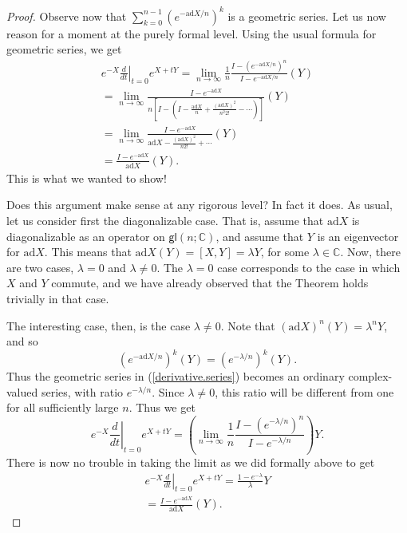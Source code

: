 \documentclass{amsbook}
\theoremstyle{plain}
\numberwithin{equation}{chapter}
\numberwithin{theorem}{chapter}
\begin{document}
\begin{proof}
Observe now that $\sum_{k=0}^{n-1}\left(  e^{-\mathrm{ad}X/n}\right)  ^{k}$ is
a geometric series. Let us now reason for a moment at the purely formal level.
Using the usual formula for geometric series, we get
\begin{align*}
e^{-X}\left.  \frac{d}{dt}\right|  _{t=0}e^{X+tY}=\lim_{n\rightarrow\infty
}\frac{1}{n}\frac{I-\left(  e^{-\mathrm{ad}X/n}\right)  ^{n}}%
{I-e^{-\mathrm{ad}X/n}}(Y)\\
=\lim_{n\rightarrow\infty}\frac{I-e^{-\mathrm{ad}X}}{n\left[  I-\left(
I-\frac{\mathrm{ad}X}{n}+\frac{(\mathrm{ad}X)^{2}}{n^{2}2!}-\cdots\right)
\right]  }(Y)\\
=\lim_{n\rightarrow\infty}\frac{I-e^{-\mathrm{ad}X}}{\mathrm{ad}%
X-\frac{(\mathrm{ad}X)^{2}}{n2!}+\cdots}(Y)\\
=\frac{I-e^{-\mathrm{ad}X}}{\mathrm{ad}X}(Y)\text{.}%
\end{align*}
This is what we wanted to show!

Does this argument make sense at any rigorous level? In fact it does. As
usual, let us consider first the diagonalizable case. That is, assume that
$\mathrm{ad}X$ is diagonalizable as an operator on $\mathsf{gl}(n;\mathbb{C}%
)$, and assume that $Y$ is an eigenvector for $\mathrm{ad}X$. This means that
$\mathrm{ad}X(Y)=[X,Y]=\lambda Y$, for some $\lambda\in\mathbb{C}$. Now, there
are two cases, $\lambda=0$ and $\lambda\neq0$. The $\lambda=0$ case
corresponds to the case in which $X$ and $Y$ commute, and we have already
observed that the Theorem holds trivially in that case.

The interesting case, then, is the case $\lambda\neq0$. Note that $\left(
\mathrm{ad}X\right)  ^{n}(Y)=\lambda^{n}Y$, and so
\[
\left(  e^{-\mathrm{ad}X/n}\right)  ^{k}(Y)=\left(  e^{-\lambda/n}\right)
^{k}(Y)\text{.}%
\]
Thus the geometric series in (\ref{derivative.series}) becomes an ordinary
complex-valued series, with ratio $e^{-\lambda/n}$. Since $\lambda\neq0$, this
ratio will be different from one for all sufficiently large $n$. Thus we get
\[
e^{-X}\left.  \frac{d}{dt}\right|  _{t=0}e^{X+tY}=\left(  \lim_{n\rightarrow
\infty}\frac{1}{n}\frac{I-\left(  e^{-\lambda/n}\right)  ^{n}}{I-e^{-\lambda
/n}}\right)  Y\text{.}%
\]
There is now no trouble in taking the limit as we did formally above to get
\begin{align*}
e^{-X}\left.  \frac{d}{dt}\right|  _{t=0}e^{X+tY}=\frac{1-e^{-\lambda}%
}{\lambda}Y\\
=\frac{I-e^{-\mathrm{ad}X}}{\mathrm{ad}X}(Y)\text{.}%
\end{align*}


\end{proof}
\end{document}
